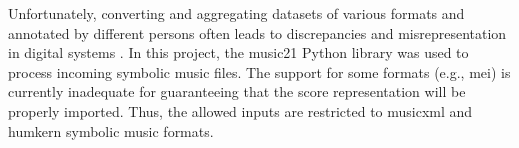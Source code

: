 

Unfortunately, converting and aggregating datasets of various
formats and annotated by different persons often leads to
discrepancies and misrepresentation in digital systems
\parencite{napoleslopez2018encoding,
napoleslopez2019effects}. In this project, the music21
Python library \parencite{cuthbert2010music21} was used to
process incoming symbolic music files. The support for some
formats (e.g., \gls{mei}) is currently inadequate for
guaranteeing that the score representation will be properly
imported. Thus, the allowed inputs are restricted to
\gls{musicxml} and \gls{humkern} symbolic music formats.
